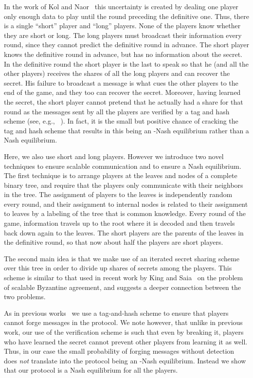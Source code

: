 \documentclass[12pt]{article}
\theoremstyle{definition}
\begin{document}
In the work of Kol and Naor~\cite{kol2008games} this uncertainty is
created by dealing one player only enough data to play until the round
preceding the definitive one.  Thus, there is a single ``short''
player and  ``long'' players.  None of the players know whether
they are short or long.  The long players must broadcast their
information every round, since they cannot predict the definitive
round in advance. The short player knows the definitive round in
advance, but has no information about the secret. In the definitive
round the short player is the last to speak so that he (and all the
other players) receives the shares of all the long players and can
recover the secret. His failure to broadcast a message is what cues
the other players to the end of the game, and they too can recover the
secret. Moreover, having learned the secret, the short player cannot
pretend that he actually had a share for that round as the messages
sent by all the players are verified by a tag and hash scheme (see,
e.g., ~\cite{wegman1981new,rabin1989verifiable, kol2008games}). In
fact, it is the small but positive chance of cracking the tag and hash
scheme that results in this being an -Nash equilibrium
rather than a Nash equilibrium.

Here, we also use short and long players. However we introduce two
novel techniques to ensure scalable communication and to ensure a Nash
equilibrium.  The first technique is to arrange players at the leaves
and nodes of a complete binary tree, and require that the players only
communicate with their neighbors in the tree. The assignment of
players to the leaves is independently random every round, and their
assignment to internal nodes is related to their assignment to leaves
by a labeling of the tree that is common knowledge.  Every round of
the game, information travels up to the root where it is decoded and
then travels back down again to the leaves. The short players are the
parents of the leaves in the definitive round, so that now about half
the players are short players.

The second main idea is that we make use of an iterated secret sharing
scheme over this tree in order to divide up shares of secrets among
the players.  This scheme is similar to that used in recent work by
King and Saia~\cite{king2010breaking} on the problem of scalable
Byzantine agreement, and suggests a deeper connection between the two
problems.

As in previous works~\cite{wegman1981new,rabin1989verifiable,
  kol2008games} we use a tag-and-hash scheme to ensure that players
cannot forge messages in the protocol. We note however, that unlike in
previous work, our use of the verification scheme is such that even by
breaking it, players who have learned the secret cannot prevent other
players from learning it as well. Thus, in our case the small
probability of forging messages without detection does \emph{not}
translate into the protocol being an -Nash equilibrium.
Instead we show that our protocol is a Nash equilibrium for all the
players.
\end{document}
